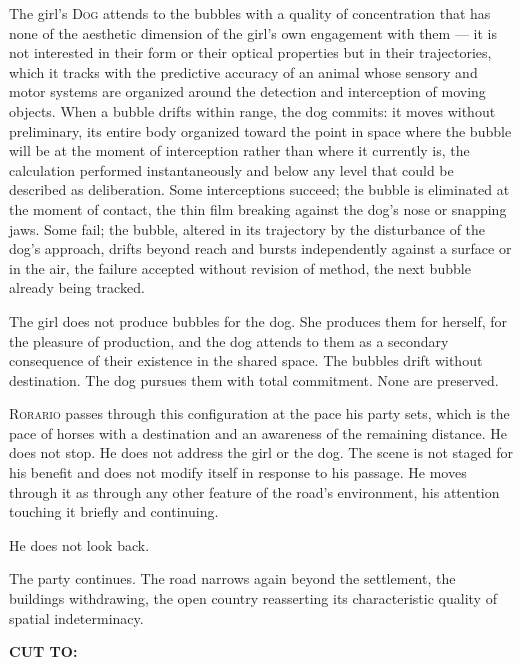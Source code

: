 \documentclass[12pt, oneside]{article}
\newenvironment{action}{%
  \vspace{0.6em}%
  \noindent\ignorespaces%
}{%
  \par\vspace{0.6em}%
}
\newcommand{\scenenumber}[1]{%
  \vspace{1em}%
  \noindent{\small\bfseries\scshape Scene #1}%
  \vspace{0.3em}\par%
}
\newcommand{\transition}[1]{%
  \vspace{0.8em}%
  \begin{flushright}%
    \bfseries #1%
  \end{flushright}%
  \vspace{0.5em}%
}
\begin{document}
\begin{action}
The girl's \textsc{Dog} attends to the bubbles with a quality of concentration that has none of the aesthetic dimension of the girl's own engagement with them --- it is not interested in their form or their optical properties but in their trajectories, which it tracks with the predictive accuracy of an animal whose sensory and motor systems are organized around the detection and interception of moving objects. When a bubble drifts within range, the dog commits: it moves without preliminary, its entire body organized toward the point in space where the bubble will be at the moment of interception rather than where it currently is, the calculation performed instantaneously and below any level that could be described as deliberation. Some interceptions succeed; the bubble is eliminated at the moment of contact, the thin film breaking against the dog's nose or snapping jaws. Some fail; the bubble, altered in its trajectory by the disturbance of the dog's approach, drifts beyond reach and bursts independently against a surface or in the air, the failure accepted without revision of method, the next bubble already being tracked.

The girl does not produce bubbles for the dog. She produces them for herself, for the pleasure of production, and the dog attends to them as a secondary consequence of their existence in the shared space. The bubbles drift without destination. The dog pursues them with total commitment. None are preserved.
\end{action}

\begin{action}
\textsc{Rorario} passes through this configuration at the pace his party sets, which is the pace of horses with a destination and an awareness of the remaining distance. He does not stop. He does not address the girl or the dog. The scene is not staged for his benefit and does not modify itself in response to his passage. He moves through it as through any other feature of the road's environment, his attention touching it briefly and continuing.

He does not look back.

The party continues. The road narrows again beyond the settlement, the buildings withdrawing, the open country reasserting its characteristic quality of spatial indeterminacy.
\end{action}

\transition{CUT TO:}

\scenenumber{8a — Animal Sequence: Dusk}
\end{document}
